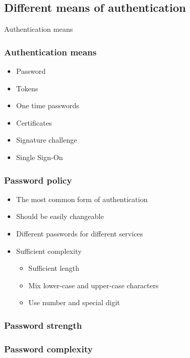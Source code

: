 \subsection{Different means of authentication}
\begin{frametransition}{Authentication means}
\end{frametransition}

\begin{frame}
\frametitle{Authentication means}
\begin{itemize}
\item<+-> Password
\item<+-> Tokens
\item<+-> One time passwords
\item<+-> Certificates
\item<+-> Signature challenge
\item<+-> Single Sign-On
\end{itemize}
\end{frame}

\begin{frame}
\frametitle{Password policy}
\pause
\begin{itemize}
\item<+-> The most common form of authentication
\item<+-> Should be easily changeable
\item<+-> Different passwords for different services
\item<+-> Sufficient complexity
\begin{itemize}
\normalsize
\item<+-> Sufficient length
\item<+-> Mix lower-case and upper-case characters
\item<+-> Use number and special digit
\end{itemize}
\end{itemize}
\end{frame}

\begin{frame}
\frametitle{Password strength}
\end{frame}

\begin{frame}
\frametitle{Password complexity}
\end{frame}

